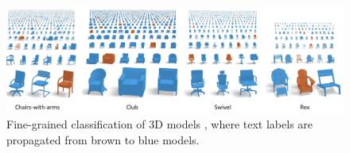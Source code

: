 \begin{figure}[bt]
\centering
    \includegraphics[width=1.0\columnwidth]{fig/search/huang_siga13_fine.png}
    \caption{
    Fine-grained classification of 3D models \protect\cite{Huang:2013:FSL}, where text labels are propagated from brown to blue models. }
    \label{fig:fine-grained}
\end{figure}

